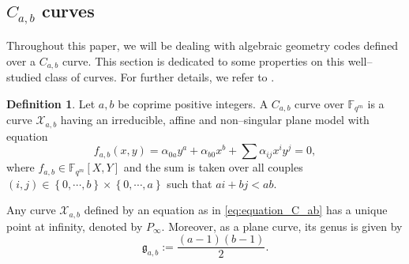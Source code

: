 \documentclass[a4paper]{article}
\theoremstyle{definition}
\newtheorem{definition}[thm]{Definition}
\theoremstyle{remark}
\newcommand{\calX}{\mathcal{X}}
\newcommand{\fqm}{\mathbb{F}_{q^m}}
\newcommand{\set}[1]{\left\{#1\right\}}
\begin{document}
\subsection{$C_{a,b}$ curves} \label{section:C_a,b_codes}
Throughout this paper, we will be dealing with algebraic geometry codes defined over a $C_{a,b}$ curve. This section is dedicated to some properties on this well--studied class of curves. For further details, we refer to \cite{Miu93}. 

\begin{definition} \label{def:C_ab_curves} 
Let $a,b$ be coprime positive integers. A $C_{a,b}$ curve over $\fqm$ is a curve $\calX_{a,b}$ having an irreducible, affine and non--singular plane model with equation
\begin{equation} \label{eq:equation_C_ab}
f_{a,b}(x,y) = \alpha_{0a}y^a + \alpha_{b0}x^b + \sum \alpha_{ij}x^iy^j = 0,
\end{equation}
where $f_{a,b} \in \fqm[X,Y]$ and the sum is taken over all couples $(i,j) \in \set{0,\cdots,b} \times \set{0,\cdots,a}$ such that $ai+bj < ab$.
\end{definition}
Any curve $\calX_{a,b}$ defined by an equation as in \eqref{eq:equation_C_ab} has a unique point at infinity, denoted by $P_{\infty}$. Moreover, as a plane curve, its genus is given by
\[\mathfrak{g}_{a,b}:=\dfrac{(a-1)(b-1)}{2}.\]

\end{document}
